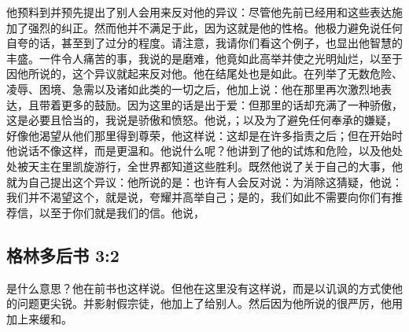 他预料到并预先提出了别人会用来反对他的异议：尽管他先前已经用和这些表达施加了强烈的纠正。然而他并不满足于此，因为这就是他的性格。他极力避免说任何自夸的话，甚至到了过分的程度。请注意，我请你们看这个例子，也显出他智慧的丰盛。一件令人痛苦的事，我说的是磨难，他竟如此高举并使之光明灿烂，以至于因他所说的，这个异议就起来反对他。他在结尾处也是如此。在列举了无数危险、凌辱、困境、急需以及诸如此类的一切之后，他加上说：他在那里再次激烈地表达，且带着更多的鼓励。因为这里的话是出于爱：但那里的话却充满了一种骄傲，这是必要且恰当的，我说是骄傲和愤怒。他说，；以及为了避免任何奉承的嫌疑，好像他渴望从他们那里得到尊荣，他这样说：这却是在许多指责之后；但在开始时他说话不像这样，而是更温和。他说什么呢？他讲到了他的试炼和危险，以及他处处被天主在里凯旋游行，全世界都知道这些胜利。既然他说了关于自己的大事，他就为自己提出这个异议：他所说的是：也许有人会反对说：为消除这猜疑，他说：我们并不渴望这个，就是说，夸耀并高举自己；是的，我们如此不需要向你们有推荐信，以至于你们就是我们的信。他说，\par


\subsection{格林多后书 3:2}

\par

是什么意思？他在前书也这样说。但他在这里没有这样说，而是以讥讽的方式使他的问题更尖锐。并影射假宗徒，他加上了给别人。然后因为他所说的很严厉，他用加上来缓和。\par


